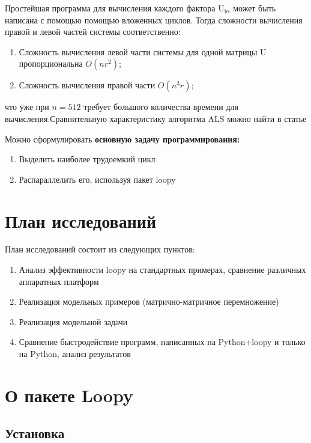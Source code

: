 \documentclass{scrartcl}
\begin{document}
Простейшая программа для вычисления каждого фактора U$_{\mathrm{i \alpha}}$ может быть написана с помощью
помощью вложенных циклов. Тогда сложности вычисления правой и левой частей системы соответственно:
\begin{enumerate}
\item Сложность вычисления левой части системы для одной матрицы U пропорциональна $O(nr^2)$;
\item Сложность вычисления правой части $O (n^3r)$;
\end{enumerate}

что уже при $n=512$ требует большого количества времени для вычисления.Сравнительную характеристику алгоритма ALS можно найти в статье \cite{faber2003recent}

Можно сформулировать \bfseries основную задачу программирования:

\begin{enumerate}
\item Выделить наиболее трудоемкий цикл
\item Распараллелить его, используя пакет loopy
\end{enumerate}
\mdseries
\section{План исследований}
\label{sec-6}

План исследований состоит из следующих пунктов:
\begin{enumerate}
\item Анализ эффективности loopy на стандартных примерах, сравнение различных аппаратных платформ
\item Реализация модельных примеров (матрично-матричное перемножение)
\item Реализация модельной задачи
\item Сравнение быстродействие программ, написанных на Python+loopy и только на Python, анализ результатов
\end{enumerate}
\section{О пакете Loopy}
\label{sec-7}
\subsection{Установка}
\label{sec-7-1}
\end{document}
